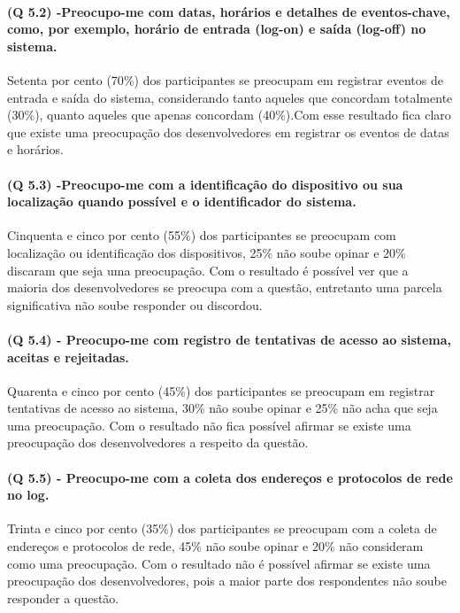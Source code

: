 \paragraph{\textbf{(Q 5.2)} -Preocupo-me com datas, horários e detalhes de eventos-chave, como, por exemplo, horário de entrada (log-on) e saída (log-off) no sistema.}

Setenta por cento (70{\%}) dos participantes se preocupam em registrar eventos de entrada e saída do sistema, considerando tanto aqueles que concordam totalmente (30{\%}), quanto aqueles que apenas concordam (40{\%}).Com esse resultado fica claro que existe uma preocupação dos desenvolvedores em registrar os eventos de datas e horários.

\paragraph{\textbf{(Q 5.3)} -Preocupo-me com a identificação do dispositivo ou sua localização quando possível e o identificador do sistema.}

Cinquenta e cinco por cento (55{\%}) dos participantes se preocupam com localização ou identificação dos dispositivos, 25{\%} não soube opinar e 20{\%} discaram que seja uma preocupação. Com o resultado é possível ver que a maioria dos desenvolvedores se preocupa com a questão, entretanto uma parcela significativa não soube responder ou discordou.

\paragraph{\textbf{(Q 5.4)} - Preocupo-me com registro de tentativas de acesso ao sistema, aceitas e rejeitadas.}

Quarenta e cinco por cento (45{\%}) dos participantes se preocupam em registrar tentativas de acesso ao sistema, 30{\%} não soube opinar e 25{\%} não acha que seja uma preocupação. Com o resultado não fica possível afirmar se existe uma preocupação dos desenvolvedores a respeito da questão.


\paragraph{\textbf{(Q 5.5)} - Preocupo-me com a coleta dos endereços e protocolos de rede no log.}

Trinta e cinco por cento (35{\%}) dos participantes se preocupam com a coleta de endereços e protocolos de rede, 45{\%} não soube opinar e 20{\%} não consideram como uma preocupação. Com o resultado não é possível afirmar se existe uma preocupação dos desenvolvedores, pois a maior parte dos respondentes não soube responder a questão.

